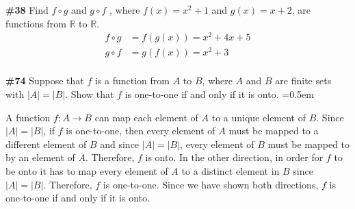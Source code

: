 \documentclass{article}
\newcommand{\problem}[1]{\textbf{\##1}}
\newcommand{\prob}[1]{\problem{#1}}
\newcommand{\AllReals}{\mathbb{R}}
\begin{document}
\prob{38} Find \(f\circ g\) and \(g \circ f\) , where \(f(x) = x^2 + 1\) and \(g(x) = x + 2\),
are functions from \(\AllReals\) to \(\AllReals\).
\begin{align*}
    f \circ g &= f(g(x))= x^2 + 4x + 5\\
    g \circ f &= g(f(x))= x^2 + 3\\
\end{align*}
\pagebreak

\prob{74} Suppose that \(f\) is a function from \(A\) to \(B\), where \(A\) and \(B\) are finite sets with \(|A| = |B|\). Show that \(f\) is one-to-one if and only if it is onto.
\parskip=0.5em

A function \(f: A \rightarrow B\) can map each element of \(A\) to a unique element of \(B\). Since \(|A| = |B|\), if \(f\) is one-to-one, then every element of \(A\) must be mapped to a different element of \(B\) and since \(|A| = |B|\), every element of \(B\) must be mapped to by an element of \(A\). Therefore, \(f\) is onto. In the other direction, in order for \(f\) to be onto it has to map every element of \(A\) to a distinct element in \(B\) since \(|A| = |B|\). Therefore, \(f\) is one-to-one. Since we have shown both directions, \(f\) is one-to-one if and only if it is onto.

\pagebreak
\end{document}
